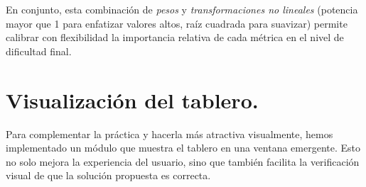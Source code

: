 \documentclass{article}
\begin{document}
\noindent
En conjunto, esta combinación de \emph{pesos} y \emph{transformaciones no lineales} (potencia mayor que 1 para enfatizar valores altos, raíz cuadrada para suavizar) permite calibrar con flexibilidad la importancia relativa de cada métrica en el nivel de dificultad final.

\section{Visualización del tablero.}

Para complementar la práctica y hacerla más atractiva visualmente, hemos implementado un módulo que muestra el tablero en una ventana emergente. Esto no solo mejora la experiencia del usuario, sino que también facilita la verificación visual de que la solución propuesta es correcta.\\
\end{document}
